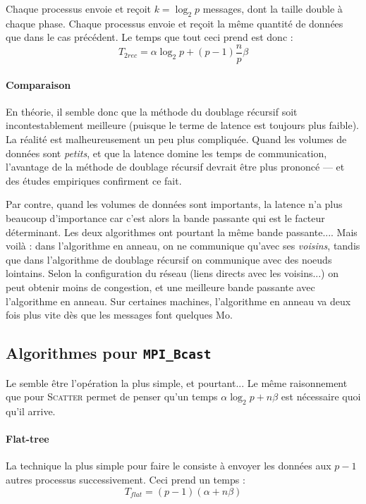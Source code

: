 \bigskip

Chaque processus envoie et reçoit $k = \log_2 p$ messages, dont la
taille double à chaque phase. Chaque processus envoie et reçoit la
même quantité de données que dans le cas précédent. Le temps que tout
ceci prend est donc :
\[
T_{2rec} = \alpha \log_2 p + (p-1) \frac{n}{p} \beta
\]

\paragraph{Comparaison}
En théorie, il semble donc que la méthode du doublage récursif soit
incontestablement meilleure (puisque le terme de latence est toujours
plus faible). La réalité est malheureusement un peu plus
compliquée. Quand les volumes de données sont \emph{petits}, et que la
latence domine les temps de communication, l'avantage de la méthode de
doublage récursif devrait être plus prononcé --- et des études
empiriques confirment ce fait.

Par contre, quand les volumes de données sont importants, la latence
n'a plus beaucoup d'importance car c'est alors la bande passante qui
est le facteur déterminant. Les deux algorithmes ont pourtant la même
bande passante.... Mais voilà : dans l'algorithme en anneau, on ne
communique qu'avec ses \emph{voisins}, tandis que dans l'algorithme de
doublage récursif on communique avec des noeuds lointains. Selon la
configuration du réseau (liens directs avec les voisins...) on peut
obtenir moins de congestion, et une meilleure bande passante avec
l'algorithme en anneau. Sur certaines machines, l'algorithme en anneau
va deux fois plus vite dès que les messages font quelques Mo.

\subsection{Algorithmes pour  \texttt{MPI\_Bcast}}

Le  semble être l'opération la plus simple, et pourtant... Le
même raisonnement que pour \textsc{Scatter} permet de penser qu'un temps
$\alpha \log_2 p + n\beta$ est nécessaire quoi qu'il arrive.

\paragraph{\og Flat-tree\fg} La technique la plus simple pour faire le
 consiste à envoyer les données aux $p-1$ autres
processus successivement. Ceci prend un temps :
\[
T_{flat} = (p-1)(\alpha + n \beta)
\]

